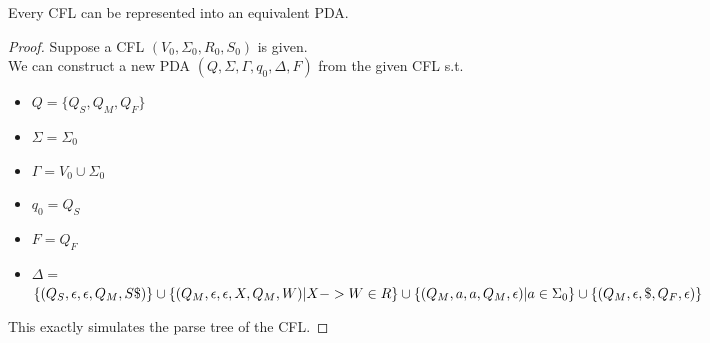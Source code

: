 \documentclass{report}
\begin{document}
			\begin{defn} \label{def_CFL}
				
			\end{defn}

			\begin{thm} \label{thm_pumping_lemma_CFL}
				
			\end{thm}
		
			\begin{thm} \label{thm_cfl_pda_equivalence}
				Every CFL can be represented into an equivalent PDA.
			\end{thm}
		
			\begin{proof}
				Suppose a CFL $(V_0,\Sigma_0,R_0,S_0)$ is given.\\
				We can construct a new PDA $(Q,\Sigma,\Gamma,q_0,\Delta,F)$ from the given CFL s.t.
				\begin{itemize}
					\item $Q=\{Q_S,Q_M,Q_F\}$
					\item $\Sigma=\Sigma_0$
					\item $\Gamma=V_0 \cup \Sigma_0$
					\item $q_0=Q_S$
					\item $F=Q_F$
					\item $\Delta=$\\
					\begin{math}
					\{(Q_S,\epsilon,\epsilon,Q_M,S\$)\}\cup\\
					\{(Q_M,\epsilon,\epsilon,X,Q_M,W)|X->W \in R\}\cup\\
					\{(Q_M,a,a,Q_M,\epsilon)|a \in \Sigma_0\}\cup\\
					\{(Q_M,\epsilon,\$,Q_F,\epsilon)\}
					\end{math}
				\end{itemize}
				This exactly simulates the parse tree of the CFL.
			\end{proof}
	
\end{document}
